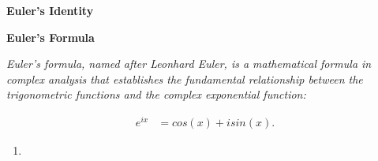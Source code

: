 \textbf{Euler's Identity}

\begin{tcolorbox}
  \textbf{Euler's Formula} 

  \vspace{0.5cm}

  \textit{
  Euler's formula, named after Leonhard Euler, is a mathematical formula in complex analysis that establishes 
  the fundamental relationship between the trigonometric functions and the complex exponential function:
  }

  \begin{align*}
      e^{ix} &= cos(x) + i sin(x).
  \end{align*}

\end{tcolorbox}

\begin{enumerate}
  \item 
\end{enumerate}
